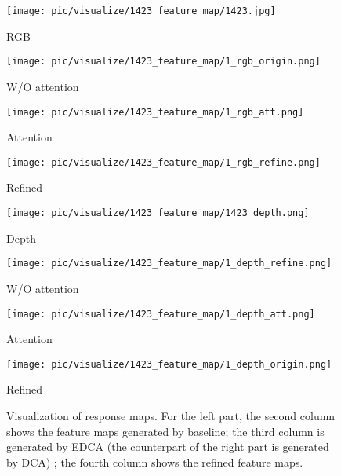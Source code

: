 \documentclass[10pt,twocolumn,letterpaper]{article}
\begin{document}
\begin{figure*}[t]
      
   \begin{minipage}[c]{0.115\linewidth}
      \texttt{[image: pic/visualize/1423\_feature\_map/1423.jpg]}
      \centerline{RGB}
   \end{minipage}
   \begin{minipage}[c]{0.115\linewidth}
      \texttt{[image: pic/visualize/1423\_feature\_map/1\_rgb\_origin.png]}
      \centerline{W/O attention}
   \end{minipage}
   \begin{minipage}[c]{0.115\linewidth}
      \texttt{[image: pic/visualize/1423\_feature\_map/1\_rgb\_att.png]}
      \centerline{Attention}
   \end{minipage}
   \begin{minipage}[c]{0.115\linewidth}
      \texttt{[image: pic/visualize/1423\_feature\_map/1\_rgb\_refine.png]}
      \centerline{Refined}
   \end{minipage}\hspace{3pt}
      \begin{minipage}[c]{0.115\linewidth}
      \texttt{[image: pic/visualize/1423\_feature\_map/1423\_depth.png]}
      \centerline{Depth}
   \end{minipage}
   \begin{minipage}[c]{0.115\linewidth}
      \texttt{[image: pic/visualize/1423\_feature\_map/1\_depth\_refine.png]}
      \centerline{W/O attention}
   \end{minipage}
   \begin{minipage}[c]{0.115\linewidth}
      \texttt{[image: pic/visualize/1423\_feature\_map/1\_depth\_att.png]}
      \centerline{Attention}
   \end{minipage}
   \begin{minipage}[c]{0.115\linewidth}
      \texttt{[image: pic/visualize/1423\_feature\_map/1\_depth\_origin.png]}
      \centerline{Refined}
   \end{minipage}
   \caption{Visualization of response maps. For the left part, the second column shows the feature maps generated by baseline; the third column is generated by EDCA (the counterpart of the right part is generated by DCA) ; the fourth column shows the refined feature maps.}
   \label{featuremap}
\end{figure*}
\end{document}
